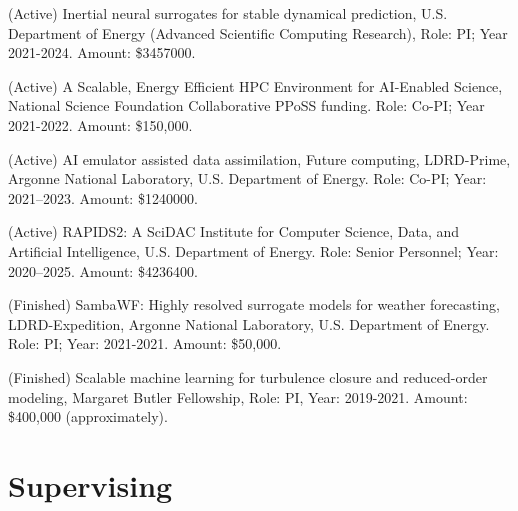 \documentclass[letterpaper]{article}
\renewenvironment{itemize}{
  \begin{list}{}{
    \setlength{\leftmargin}{1.5em}
  }
}{
  \end{list}
}
\begin{document}
\begin{itemize}

  \item (Active) Inertial neural surrogates for stable dynamical prediction, U.S. Department of Energy (Advanced Scientific Computing Research), Role: PI; Year 2021-2024. Amount: \$3457000.

  \item (Active) A Scalable, Energy Efficient HPC Environment for AI-Enabled Science, National Science Foundation Collaborative PPoSS funding. Role: Co-PI; Year 2021-2022. Amount: \$150,000.

  \item (Active) AI emulator assisted data assimilation, Future computing, LDRD-Prime, Argonne National Laboratory, U.S. Department of Energy. Role: Co-PI; Year: 2021--2023. Amount: \$1240000. 

  \item (Active) RAPIDS2: A SciDAC Institute for Computer Science, Data, and Artificial Intelligence, U.S. Department of Energy. Role: Senior Personnel; Year: 2020--2025. Amount: \$4236400.

  \item (Finished) SambaWF: Highly resolved surrogate models for weather forecasting, LDRD-Expedition, Argonne National Laboratory, U.S. Department of Energy. Role: PI; Year: 2021-2021. Amount: \$50,000. 

  \item (Finished) Scalable machine learning for turbulence closure and reduced-order modeling, Margaret Butler Fellowship, Role: PI, Year: 2019-2021. Amount: \$400,000 (approximately).


\end{itemize}


\section*{Supervising}
\end{document}
